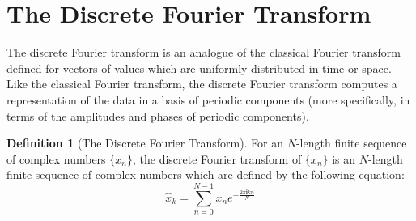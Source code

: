 \documentclass{article}
\newcommand{\ii}{\mathbf{i}}
\theoremstyle{definition}
\newtheorem{definition}{Definition}
\begin{document}
\section{The Discrete Fourier Transform}
The discrete Fourier transform is an analogue of the classical Fourier transform
defined for vectors of values which are uniformly distributed in time or space.
Like the classical Fourier transform, the discrete Fourier transform computes a
representation of the data in a basis of periodic components (more specifically,
in terms of the amplitudes and phases of periodic components).
\begin{definition}[The Discrete Fourier Transform\cite{walkerFFT}]
For an $N$-length finite sequence of complex numbers $\{x_n\}$, the discrete Fourier
transform of $\{x_n\}$ is an $N$-length finite sequence of complex numbers which
are defined by the following equation:
\begin{equation}\label{eqn:defDFT}
 \hat{x}_k = \sum_{n=0}^{N-1} x_n e^{-\frac{2 \pi \ii k n}{N}}
\end{equation}
\end{definition}
\end{document}
